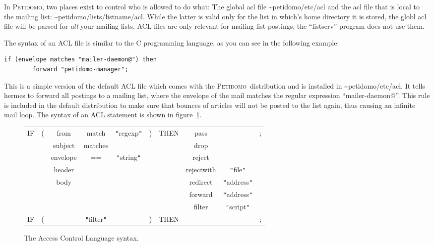 \documentclass[a4paper,10pt]{scrreprt}
\newcommand{\Petidomo}{{\scshape Peti\-domo}}
\newcommand{\file}[1]{{\sf #1}}
\begin{document}
In \Petidomo, two places exist to control who is allowed to do what:
The global acl file
\file{\~{}petidomo/etc/acl} and the acl
file that is local to the mailing list:
\file{\~{}petidomo/lists/list\-name/acl}. While the latter is valid only
for the list in which's home directory it is stored, the globl acl
file will be parsed for \emph{all} your mailing lists. ACL files are
only relevant for mailing list postings, the ``listserv'' program does
not use them.

The syntax of an ACL file is similar to the C programming
language, as you can see in the following example:
\begin{verbatim}
if (envelope matches "mailer-daemon@") then
        forward "petidomo-manager";
\end{verbatim}

This is a simple version of the default ACL file which comes with the
\Petidomo\ distribution and is installed in
\file{\~{}petidomo/etc/acl}. It tells hermes to forward all postings
to a mailing list, where the envelope of the mail matches the regular
expression ``mailer-daemon@''. This rule is included in the default
distribution to make sure that bounces of articles will not be posted
to the list again, thus causing an infinite mail loop. The syntax of
an ACL statement is shown in figure~\ref{acl syntax}.

\begin{figure}[bth]
\begin{center}
\begin{tabular}{cccccccccc}
IF & ( & from & match & {\tt "}regexp{\tt "} & ) & THEN & pass & & ; \\
   &   & subject & matches &                   &   &      & drop & & \\
   &   & envelope & ==     & {\tt "}string{\tt "}          &   &      & reject & & \\
   &   & header   & =     &                & &     & rejectwith & {\tt "}file{\tt "}  & \\
   &   & body     &       &                & &     & redirect   & {\tt "}address{\tt "} & \\
   &   &      &       &                &   &      & forward    & {\tt "}address{\tt "} & \\
   &   &      &       &                &   &      & filter     & {\tt "}script{\tt "} & \\
IF & ( &  & {\tt "}filter{\tt "} &  & ) & THEN &  & & ; \\
\end{tabular}
\caption{The Access Control Language syntax.}
\label{acl syntax}
\end{center}
\end{figure}
\end{document}
